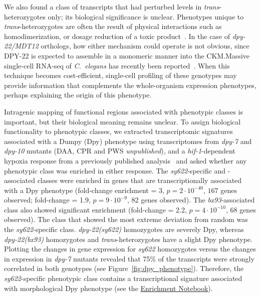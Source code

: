 \documentclass[8pt, twocolumn]{article}
\newcommand{\cel}{\emph{C.~elegans}}
\newcommand{\gene}[1]{\mbox{\emph{#1}}}
\newcommand{\protein}[1]{\mbox{\uppercase{#1}}}
\newcommand{\dpy}[1]{\gene{dpy-22#1}}
\newcommand{\bx}{\dpy{(bx93)}}
\newcommand{\sy}{\dpy{(sy622)}}
\begin{document}
We also found a class of transcripts that had perturbed levels in
\emph{trans}-heterozygotes only; its biological significance is unclear.
Phenotypes unique to \emph{trans}-heterozygotes are often the result of physical
interactions such as homodimerization, or dosage reduction of a toxic
product~\cite{Yook2005}. In the case of \dpy{/MDT12} orthologs, how either
mechanism could operate is not obvious, since \protein{dpy-22} is expected
to assemble in a monomeric manner into the CKM.\@ Massive single-cell RNA-seq
of \cel{} has recently been reported~\cite{Cao2017}. When this technique becomes
cost-efficient, single-cell profiling of these genotypes may provide information
that complements the whole-organism expression phenotypes, perhaps explaining
the origin of this phenotype.

Intragenic mapping of functional regions associated with phenotypic classes is
important, but their biological meaning remains unclear. To assign biological
functionality to phenotypic classes, we extracted transcriptomic signatures
associated with a Dumpy (Dpy) phenotype using transcriptomes from \gene{dpy-7}
and \gene{dpy-10} mutants (DAA, CPR and PWS \emph{unpublished}), and a
\gene{hif-1}-dependent hypoxia response from a previously published
analysis~\cite{AngelesAlboresHIF} and asked whether any phenotypic class was
enriched in either response. The \emph{sy622}-specific and -associated classes
were enriched in genes that are transcriptionally associated with a Dpy
phenotype (fold-change enrichment = 3, $p=2\cdot 10^{-40}$, $167$ genes
observed; fold-change = 1.9, $p=9\cdot10^{-9}$, 82 genes observed). The
\emph{bx93}-associated class also showed significant enrichment (fold-change =
2.2, $p=4\cdot10^{-10}$, 68 genes observed). The class that showed the most
extreme deviation from random was the \emph{sy622}-specific class. \sy{}
homozygotes are severely Dpy, whereas \bx{} homozygotes and
\emph{trans}-heterozygotes have a slight Dpy phenotype. Plotting the
changes in gene expression for \emph{sy622} homozygotes versus the changes in
expression in \emph{dpy-7} mutants revealed that 75\% of the transcripts were
strongly correlated in both genotypes (see Figure~\ref{fig:dpy_phenotype}).
Therefore, the \emph{sy622}-specific phenotypic class contains a transcriptional
signature associated with morphological Dpy phenotype (see the
\href{https://wormlabcaltech.github.io/med-cafe/notebook/enrichment.html}{
Enrichment Notebook}).
\end{document}
